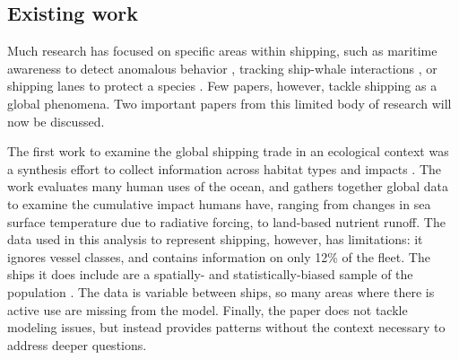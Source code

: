 


\subsection{Existing work}

Much research has focused on specific areas within shipping, such as maritime awareness to detect anomalous behavior \citep{Tun2007}, tracking ship-whale interactions \citep{jensen2004large}, or shipping lanes to protect a species \citep{Lagueux2011,Mckenna2012a}.  Few papers, however, tackle shipping as a global phenomena. Two important papers from this limited body of research will now be discussed.

The first work %
to examine the global shipping trade in an ecological context was a synthesis effort to collect information across habitat types and impacts \citep{Halpern2008}. The work evaluates many human uses of the ocean, and gathers together global data to examine the cumulative impact humans have, ranging from changes in sea surface temperature due to radiative forcing, to land-based nutrient runoff. The data used in this analysis to represent shipping, however, has limitations: it ignores vessel classes, %
 and contains information on only 12\% of the fleet. The ships it does include are a spatially- and statistically-biased sample of the population \citep{Wang2007}. The data is variable between ships, so many areas where there is active use are missing from the model. Finally, the paper does not tackle modeling issues, but instead provides patterns without the context necessary to address deeper questions. %

